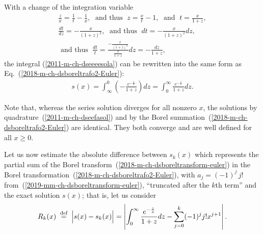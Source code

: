 With a change of the integration variable
\begin{equation}
\begin{split}
\frac{ z }{x} = \frac{1}{t}-\frac{1}{x}
, \; \textrm{ and thus }  \;
 z  = \frac{x}{t}-1
, \;  \textrm{ and } \;
t =  \frac{x}{1+  z }
, \\
\frac{dt}{d z  } =  -\frac{x}{(1+  z )^2}  , \;
\textrm{ and thus }  \;
dt =  -\frac{x}{(1+  z )^2} d z , \;    \\
\textrm{ and thus }  \;
\frac{dt}{t } =   \frac{-\frac{x}{(1+  z )^2}}{\frac{x}{1+  z }} d z
=   -\frac{ d z }{1+  z },
\end{split}
\label{2011-m-ch-dseeans}
\end{equation}
the integral (\ref{2011-m-ch-dseeeesola}) can be rewritten into the same form as Eq.~(\ref{2018-m-ch-dsboreltrafo2-Euler}):
\begin{equation}
\begin{split}
s(x)= \int_{\infty}^0
\left(-\frac{e^{-\frac{ z }{x}}}{1+ z }\right) d z
= \int_0^\infty
\frac{e^{-\frac{ z }{x}}}{1+ z } d z  .
\end{split}
\label{2011-m-ch-dseefasol}
\end{equation}

Note that, whereas the series solution diverges for all nonzero $x$,
the solutions by quadrature~(\ref{2011-m-ch-dseefasol}) and by the Borel summation~(\ref{2018-m-ch-dsboreltrafo2-Euler})
are identical. They both converge and are well defined for all $x\ge 0$.

Let us now estimate the absolute difference between $s_{k}(x)$
which represents the partial sum of the Borel transform~(\ref{2018-m-ch-dsboreltransform-euler})
in the Borel transformation~(\ref{2018-m-ch-dsboreltrafo2-Euler}),
with $a_j =  (-1)^j \, j!$
from~(\ref{2019-mm-ch-dsboreltransform-euler}),
 ``truncated after the $k$th term'' and the exact solution $s(x)$; that is, let us consider
\begin{equation}
\begin{split}
  R_k(x)
\stackrel{{\tiny \textrm{ def }}}{=}
\Big\vert s(x) - s_{k}(x) \Big\vert=
\left\vert \int_0^\infty
\frac{e^{-\frac{ z }{x}}}{1+ z } d z
-
\sum_{j=0}^k (-1)^j j! x^{j+1} \right\vert .
\end{split}
\label{2011-m-ch-dseeanest}
\end{equation}


